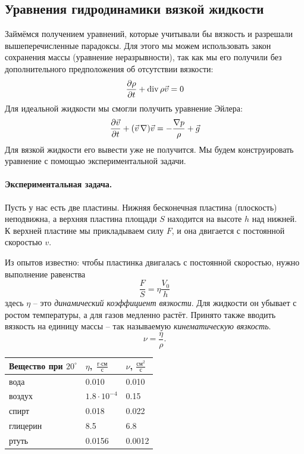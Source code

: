 \subsection{Уравнения гидродинамики вязкой жидкости}

Займёмся получением уравнений, которые учитывали бы вязкость и разрешали вышеперечисленные парадоксы. Для этого мы можем использовать закон сохранения массы (уравнение неразрывности), так как мы его получили без дополнительного предположения об отсутствии вязкости:
\begin{equation}
    \pdv{\rho}{t}+\operatorname{div} \rho \vec{v} = 0
\end{equation}
Для идеальной жидкости мы смогли получить уравнение Эйлера:
\begin{equation}
    \pdv{\vec{v}}{t}+(\vec{v}\,\nabla)\vec{v} = -\frac{\nabla p}{\rho}+\vec{g}
\end{equation}
Для вязкой жидкости его вывести уже не получится. Мы будем конструировать уравнение с помощью экспериментальной задачи.

\paragraph{Экспериментальная задача.} Пусть у нас есть две пластины. Нижняя бесконечная пластина (плоскость) неподвижна, а верхняя пластина площади $S$ находится на высоте $h$ над нижней. К верхней пластине мы прикладываем силу $F$, и она двигается с постоянной скоростью $v$.

Из опытов известно: чтобы пластинка двигалась с постоянной скоростью, нужно выполнение равенства
\begin{equation}
    \frac{F}{S} = \eta \frac{V_0}{h}
\end{equation}
здесь $\eta$ -- это \textit{динамический коэффициент вязкости}. Для жидкости он убывает с ростом температуры, а для газов медленно растёт.
Принято также вводить вязкость на единицу массы -- так называемую \textit{кинематическую вязкость}.
\begin{equation}
    \nu = \frac{\eta}{\rho}.
\end{equation}

\begin{table}[H]
\centering
\begin{tabular}{lll}
\toprule
Вещество при $20^\circ$ & $\eta$, $\frac{\text{г}\cdot\text{см}}{\text{с}}$ & $\nu$, $\frac{\text{см}^2}{\text{с}}$ \\ \midrule
 вода &	0.010 &	0.010 \\
воздух & $1.8\cdot10^{-4}$ & 0.15 \\
спирт &	0.018 &	0.022 \\
глицерин &	8.5 &	6.8 \\
ртуть &	0.0156 &	0.0012 \\\bottomrule
\end{tabular}
\end{table}

